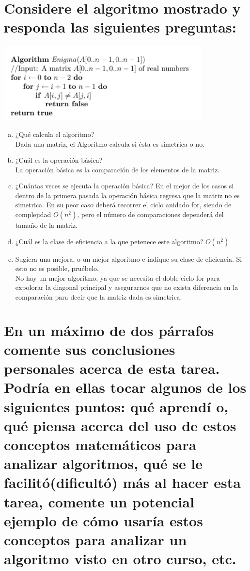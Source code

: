 \documentclass{article}
\begin{document}
\newpage
\section{Considere el algoritmo mostrado y responda las siguientes preguntas:}

\includegraphics[scale=0.7]{algo.png}

\begin{enumerate}[(a)]
\item ¿Qué calcula el algoritmo?\\
  Dada una matriz, el Algoritmo calcula si ésta es simetrica o no.
\item ¿Cuál es la operación básica?\\
  La operación básica es la comparación de los elementos de la matriz.
\item ¿Cuántas veces se ejecuta la operación básica?
  En el mejor de los casos si dentro de la primera pasada la operación básica regresa que la matriz no es simetrica. En su peor caso deberá recorrer el ciclo anidado for, siendo de complejidad $O(n^2)$, pero el número de comparaciones dependerá del tamaño de la matriz.\\
\item ¿Cuál es la clase de eficiencia a la que petenece este algoritmo?
  $O(n^2)$
\item Sugiera una mejora, o un mejor algoritmo e indique su clase de eficiencia. Si esto no es posible, pruébelo.\\
  No hay un mejor algoritmo, ya que se necesita el doble ciclo for para expolorar la diagonal principal y asegurarnos que no exista diferencia en la comparación para decir que la matriz dada es simetrica.
\end{enumerate}

\section{En un máximo de dos párrafos comente sus conclusiones personales acerca de esta tarea. Podría en ellas tocar algunos de los siguientes puntos: qué aprendí o, qué piensa acerca del uso de estos conceptos matemáticos para analizar algoritmos, qué se le facilitó(dificultó) más al hacer esta tarea, comente un potencial ejemplo de cómo usaría estos conceptos para analizar un algoritmo visto en otro curso, etc.}
\end{document}

